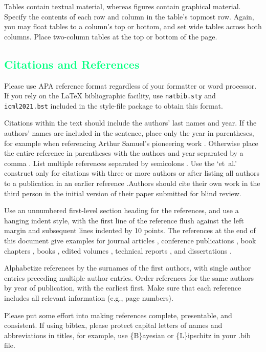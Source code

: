\documentclass{article}
\newcommand{\csubsection}[1]{\subsection{\textcolor{springgreen}{#1}}}
\begin{document}
Tables contain textual material, whereas figures contain graphical material.
Specify the contents of each row and column in the table's topmost
row. Again, you may float tables to a column's top or bottom, and set
wide tables across both columns. Place two-column tables at the
top or bottom of the page.

\csubsection{Citations and References}

Please use APA reference format regardless of your formatter
or word processor. If you rely on the \LaTeX\/ bibliographic
facility, use \texttt{natbib.sty} and \texttt{icml2021.bst}
included in the style-file package to obtain this format.

Citations within the text should include the authors' last names and
year. If the authors' names are included in the sentence, place only
the year in parentheses, for example when referencing Arthur Samuel's
pioneering work . Otherwise place the entire
reference in parentheses with the authors and year separated by a
comma \cite{Samuel59}. List multiple references separated by
semicolons \cite{kearns89,Samuel59,mitchell80}. Use the `et~al.'
construct only for citations with three or more authors or after
listing all authors to a publication in an earlier reference \cite{MachineLearningI}.Authors should cite their own work in the third person
in the initial version of their paper submitted for blind review.

Use an unnumbered first-level section heading for the references, and use a
hanging indent style, with the first line of the reference flush against the
left margin and subsequent lines indented by 10 points. The references at the
end of this document give examples for journal articles \cite{Samuel59},
conference publications \cite{langley00}, book chapters \cite{Newell81}, books
\cite{DudaHart2nd}, edited volumes \cite{MachineLearningI}, technical reports
\cite{mitchell80}, and dissertations \cite{kearns89}.

Alphabetize references by the surnames of the first authors, with
single author entries preceding multiple author entries. Order
references for the same authors by year of publication, with the
earliest first. Make sure that each reference includes all relevant
information (e.g., page numbers).

Please put some effort into making references complete, presentable, and
consistent. If using bibtex, please protect capital letters of names and
abbreviations in titles, for example, use \{B\}ayesian or \{L\}ipschitz
in your .bib file.
\end{document}
